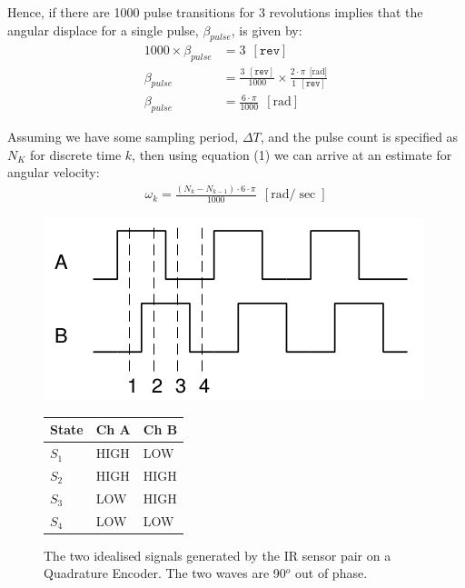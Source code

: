 \documentclass[a4paper]{article}
\begin{document}
Hence, if there are 1000 pulse transitions for 3 revolutions implies that the angular displace for a single pulse, $\beta_{pulse}$, is given by:
\begin{align}
1000 \times \beta_{pulse} &= 3 \ \ [\texttt{rev}] \nonumber\\
\beta_{pulse} &= \frac{3 \ \ [\texttt{rev}]}{1000} \times \frac{2 \cdot \pi \ \ {[\si{\radian}}]}{1 \ \ [\texttt{rev}]} \nonumber\\
\beta_{pulse} &= \frac{6 \cdot \pi}{1000} \ \ [\si{\radian}]
\end{align}

Assuming we have some sampling period, $\Delta T$, and the pulse count is specified as $N_K$ for discrete time $k$, then using equation (1) we can arrive at an estimate for angular velocity:
\begin{align}
\omega_k = \frac{(N_{k} - N_{k-1}) \cdot 6 \cdot \pi}{1000} \ \ [\si{\radian\per\sec}]
\end{align}


\begin{figure}[h]
\centering
\begin{minipage}{0.45\textwidth}
\centering
\includegraphics[scale=0.4]{optical_encoder_signal}
\caption{The two idealised signals generated by the IR sensor pair on a Quadrature Encoder. The two waves are 90$^o$ out of phase.}
\end{minipage}
\hspace{1cm}
\begin{minipage}{0.45\textwidth}
\centering
{}
\begin{tabular}{lll}
\toprule
\textbf{State} & \textbf{Ch A} & \textbf{Ch B}\\
\midrule
$S_1$ & HIGH & LOW\\
$S_2$ & HIGH & HIGH\\
$S_3$ & LOW & HIGH\\
$S_4$ & LOW & LOW\\
\bottomrule
\end{tabular}
\end{minipage}
\end{figure}
\end{document}
